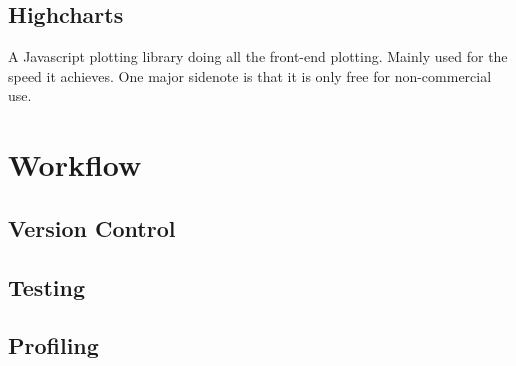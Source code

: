 \documentclass[a4paper, openany, oneside]{memoir}
\begin{document}
\subsection{Highcharts}
\label{sec:highcharts}
A Javascript plotting library doing all the front-end plotting. Mainly used for the speed it achieves. One major sidenote is that it is only free for non-commercial use.

\section{Workflow}
\label{sec:workflow}

\subsection{Version Control}
\label{sec:version-control}

\subsection{Testing}
\label{sec:testing}

\subsection{Profiling}
\label{sec:profiling}
\end{document}

